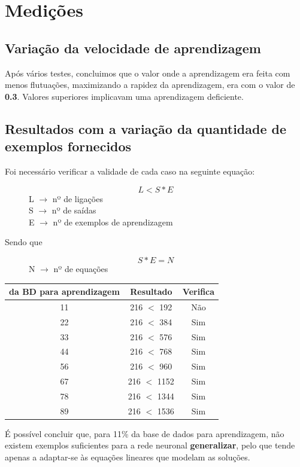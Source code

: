 \documentclass[10pt,a4paper]{article}
\begin{document}
\section{Medições}

\subsection{Variação da velocidade de aprendizagem}

Após vários testes, concluimos que o valor onde a aprendizagem era feita com menos flutuações, maximizando a rapidez da aprendizagem, era com o valor de \textbf{0.3}. Valores superiores implicavam uma aprendizagem deficiente.

\subsection{Resultados com a variação da quantidade de exemplos fornecidos}

Foi necessário verificar a validade de cada caso na seguinte equação:

\begin{figure}[here]
\centering
\[L<S*E\]
L $\rightarrow$ nº de ligações \\ S $\rightarrow$ nº de saídas \\ E $\rightarrow$ nº de exemplos de aprendizagem
\end{figure}

Sendo que 
\begin{figure}[here]
\centering
\[S*E = N\]
N $\rightarrow$ nº de equações
\end{figure}


\begin{tabular}{|c|c|c|}
\hline 
da BD para aprendizagem & Resultado & Verifica \\ 
\hline 
11 & 216 $<$ 192 & Não \\ 
22 & 216 $<$ 384 & Sim \\ 
33 & 216 $<$ 576 & Sim \\ 
44 & 216 $<$ 768 & Sim \\ 
56 & 216 $<$ 960 & Sim \\ 
67 & 216 $<$ 1152 & Sim \\ 
78 & 216 $<$ 1344 & Sim \\ 
89 & 216 $<$ 1536 & Sim \\ 
\hline
\end{tabular} 

É possível concluir que, para 11\% da base de dados para aprendizagem, não existem exemplos suficientes para a rede neuronal \textbf{generalizar}, pelo que tende apenas a adaptar-se às equações lineares que modelam as soluções.
\end{document}
